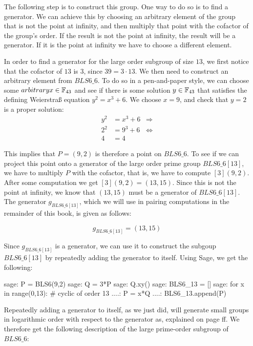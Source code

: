 The following step is to construct this group. One way to do so is to find a generator. We can achieve this by choosing an arbitrary element of the group that is not the point at infinity, and then multiply that point with the cofactor of the group's order. If the result is not the point at infinity, the result will be a generator. If it is the point at infinity we have to choose a different element. 

In order to find a generator for the large order subgroup of size $13$, we first notice that the cofactor of $13$ is $3$, since $39=3\cdot 13$. We then need to construct an arbitrary element from $BLS6\_6$. To do so in a pen-and-paper style, we can choose some $arbitrary x\in\mathbb{F}_{43}$ and see if there is some solution $y\in\mathbb{F}_{43}$ that satisfies the defining Weierstraß equation $y^2 = x^3 + 6$. We choose $x=9$, and check that $y=2$ is a proper solution:
\begin{align*}
y^2 & = x^3 + 6 & \Rightarrow \\
2^2 & = 9^3 + 6 & \Leftrightarrow \\
4 & = 4
\end{align*}   

This implies that $P=(9,2)$ is therefore a point on $BLS6\_6$. To see if we can project this point onto a generator of the large order prime group $BLS6\_6[13]$, we have to multiply $P$ with the cofactor, that is, we have to compute $[3](9,2)$. After some computation  we get $[3](9,2) = (13,15)$. Since this is not the point at infinity, we know that $(13,15)$ must be a generator of $BLS6\_6[13]$. The generator $g_{BLS6\_6[13]}$, which we will use in pairing computations in the remainder of this book, is given as follows:

\begin{equation}\label{gBLS6-6-13}
g_{BLS6\_6[13]} = (13,15)
\end{equation}

Since $g_{BLS6\_6[13]}$ is a generator, we can use it to construct the subgoup $BLS6\_6[13]$ by repeatedly adding the generator to itself. Using Sage, we get the following:
\begin{sagecommandline}
sage: P = BLS6(9,2)
sage: Q = 3*P
sage: Q.xy()
sage: BLS6_13 = []
sage: for x in range(0,13): # cyclic of order 13
....:     P = x*Q
....:     BLS6_13.append(P)
\end{sagecommandline}
Repeatedly adding a generator to itself, as we just did, will generate small groups in logarithmic order with respect to the generator as, explained on page \pageref{generators} ff. We therefore get the following description of the large prime-order subgroup of $BLS6\_6$:

